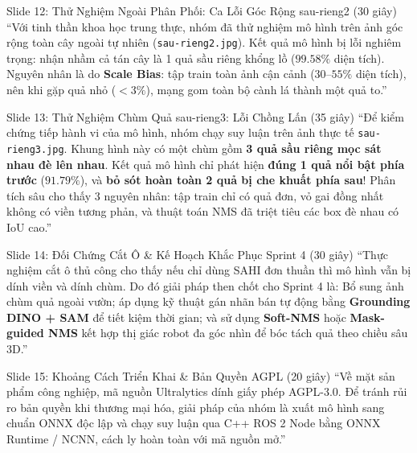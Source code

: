 \documentclass[11pt,a4paper]{article}
\begin{document}
\vspace{4pt}

\begin{scriptbox}{Slide 12: Thử Nghiệm Ngoài Phân Phối: Ca Lỗi Góc Rộng sau-rieng2 (30 giây)}
``Với tinh thần khoa học trung thực, nhóm đã thử nghiệm mô hình trên ảnh góc rộng toàn cây ngoài tự nhiên (\texttt{sau-rieng2.jpg}). Kết quả mô hình bị lỗi nghiêm trọng: nhận nhầm cả tán cây là 1 quả sầu riêng khổng lồ ($99.58\%$ diện tích). Nguyên nhân là do \textbf{Scale Bias}: tập train toàn ảnh cận cảnh ($30\text{--}55\%$ diện tích), nên khi gặp quả nhỏ ($<3\%$), mạng gom toàn bộ cành lá thành một quả to.''
\end{scriptbox}

\vspace{4pt}

\begin{scriptbox}{Slide 13: Thử Nghiệm Chùm Quả sau-rieng3: Lỗi Chồng Lấn (35 giây)}
``Để kiểm chứng tiếp hành vi của mô hình, nhóm chạy suy luận trên ảnh thực tế \texttt{sau-rieng3.jpg}. Khung hình này có một chùm gồm \textbf{3 quả sầu riêng mọc sát nhau đè lên nhau}. Kết quả mô hình chỉ phát hiện \textbf{đúng 1 quả nổi bật phía trước} ($91.79\%$), và \textbf{bỏ sót hoàn toàn 2 quả bị che khuất phía sau}! Phân tích sâu cho thấy 3 nguyên nhân: tập train chỉ có quả đơn, vỏ gai đồng nhất không có viền tương phản, và thuật toán NMS đã triệt tiêu các box đè nhau có IoU cao.''
\end{scriptbox}

\vspace{4pt}

\begin{scriptbox}{Slide 14: Đối Chứng Cắt Ô \& Kế Hoạch Khắc Phục Sprint 4 (30 giây)}
``Thực nghiệm cắt ô thủ công cho thấy nếu chỉ dùng SAHI đơn thuần thì mô hình vẫn bị dính viền và dính chùm. Do đó giải pháp then chốt cho Sprint 4 là: Bổ sung ảnh chùm quả ngoài vườn; áp dụng kỹ thuật gán nhãn bán tự động bằng \textbf{Grounding DINO + SAM} để tiết kiệm thời gian; và sử dụng \textbf{Soft-NMS} hoặc \textbf{Mask-guided NMS} kết hợp thị giác robot đa góc nhìn để bóc tách quả theo chiều sâu 3D.''
\end{scriptbox}

\vspace{4pt}

\begin{scriptbox}{Slide 15: Khoảng Cách Triển Khai \& Bản Quyền AGPL (20 giây)}
``Về mặt sản phẩm công nghiệp, mã nguồn Ultralytics dính giấy phép AGPL-3.0. Để tránh rủi ro bản quyền khi thương mại hóa, giải pháp của nhóm là xuất mô hình sang chuẩn ONNX độc lập và chạy suy luận qua C++ ROS 2 Node bằng ONNX Runtime / NCNN, cách ly hoàn toàn với mã nguồn mở.''
\end{scriptbox}
\end{document}
